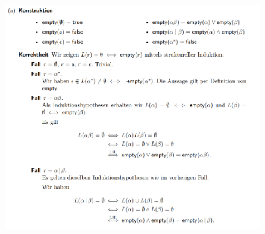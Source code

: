 \documentclass[ieeetran]{article}
\begin{document}
\begin{figure}[h!]
  \centering
  \includegraphics[width=1.0\linewidth]{strukturelleinduktion}
  \label{fig:strukturelleinduktion}
\end{figure}
\end{document}
